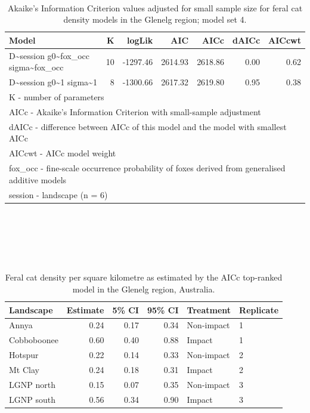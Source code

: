 \documentclass[11pt,a4paper,titlepage,twoside,openright]{style/unimelbthesis}
\begin{document}
\begin{mainmatter}
\newpage

\(~\)

\(~\)

\(~\)

\begingroup\fontsize{10}{12}\selectfont
\begin{longtable}[t]{lrrrrrr}
\caption{\label{tab:density-aic-g-4}Akaike's Information Criterion values adjusted for small sample size for feral cat density models in the Glenelg region; model set 4.}\\
\toprule
Model & K & logLik & AIC & AICc & dAICc & AICcwt\\
\midrule
D\textasciitilde{}session g0\textasciitilde{}fox\_occ sigma\textasciitilde{}fox\_occ & 10 & -1297.46 & 2614.93 & 2618.86 & 0.00 & 0.62\\
D\textasciitilde{}session g0\textasciitilde{}1 sigma\textasciitilde{}1 & 8 & -1300.66 & 2617.32 & 2619.80 & 0.95 & 0.38\\
\bottomrule
\multicolumn{7}{l}{\rule{0pt}{1em}K - number of parameters}\\
\multicolumn{7}{l}{\rule{0pt}{1em}AICc - Akaike's Information Criterion with small-sample adjustment}\\
\multicolumn{7}{l}{\rule{0pt}{1em}dAICc - difference between AICc of this model and the model with smallest AICc}\\
\multicolumn{7}{l}{\rule{0pt}{1em}AICcwt - AICc model weight}\\
\multicolumn{7}{l}{\rule{0pt}{1em}fox\_occ - fine-scale occurrence probability of foxes derived from generalised additive models}\\
\multicolumn{7}{l}{\rule{0pt}{1em}session - landscape (n = 6)}\\
\end{longtable}
\endgroup{}

\newpage

\(~\)

\(~\)

\(~\)

\begingroup\fontsize{10}{12}\selectfont
\begin{longtable}[t]{lrrrll}
\caption{\label{tab:density-landscape-est}Feral cat density per square kilometre as estimated by the AICc top-ranked model in the Glenelg region, Australia.}\\
\toprule
Landscape & Estimate & 5\% CI & 95\% CI & Treatment & Replicate\\
\midrule
Annya & 0.24 & 0.17 & 0.34 & Non-impact & 1\\
Cobboboonee & 0.60 & 0.40 & 0.88 & Impact & 1\\
Hotspur & 0.22 & 0.14 & 0.33 & Non-impact & 2\\
Mt Clay & 0.24 & 0.18 & 0.31 & Impact & 2\\
LGNP north & 0.15 & 0.07 & 0.35 & Non-impact & 3\\
\addlinespace
LGNP south & 0.56 & 0.34 & 0.90 & Impact & 3\\
\bottomrule
\end{longtable}
\endgroup{}


\end{mainmatter}
\end{document}

